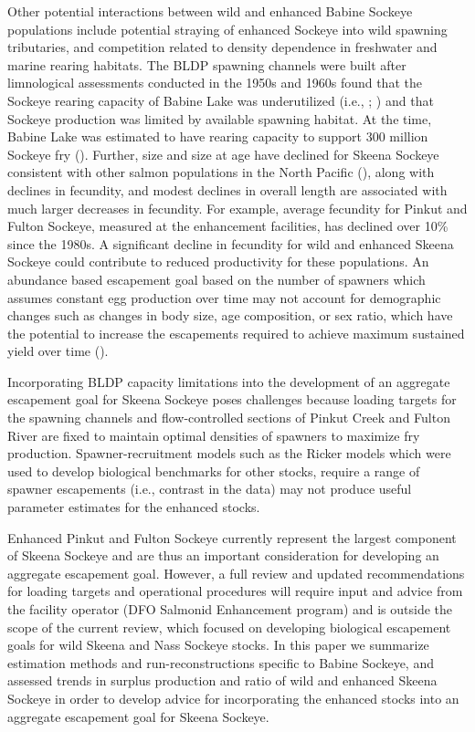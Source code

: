 \documentclass[french,11pt]{book}
\begin{document}
Other potential interactions between wild and enhanced Babine Sockeye populations include potential straying of enhanced Sockeye into wild spawning tributaries, and competition related to density dependence in freshwater and marine rearing habitats. The BLDP spawning channels were built after limnological assessments conducted in the 1950s and 1960s found that the Sockeye rearing capacity of Babine Lake was underutilized (i.e., ; ) and that Sockeye production was limited by available spawning habitat. At the time, Babine Lake was estimated to have rearing capacity to support 300 million Sockeye fry (). Further, size and size at age have declined for Skeena Sockeye consistent with other salmon populations in the North Pacific (), along with declines in fecundity, and modest declines in overall length are associated with much larger decreases in fecundity. For example, average fecundity for Pinkut and Fulton Sockeye, measured at the enhancement facilities, has declined over 10\% since the 1980s. A significant decline in fecundity for wild and enhanced Skeena Sockeye could contribute to reduced productivity for these populations. An abundance based escapement goal based on the number of spawners which assumes constant egg production over time may not account for demographic changes such as changes in body size, age composition, or sex ratio, which have the potential to increase the escapements required to achieve maximum sustained yield over time ().

Incorporating BLDP capacity limitations into the development of an aggregate escapement goal for Skeena Sockeye poses challenges because loading targets for the spawning channels and flow-controlled sections of Pinkut Creek and Fulton River are fixed to maintain optimal densities of spawners to maximize fry production. Spawner-recruitment models such as the Ricker models which were used to develop biological benchmarks for other stocks, require a range of spawner escapements (i.e., contrast in the data) may not produce useful parameter estimates for the enhanced stocks.

Enhanced Pinkut and Fulton Sockeye currently represent the largest component of Skeena Sockeye and are thus an important consideration for developing an aggregate escapement goal. However, a full review and updated recommendations for loading targets and operational procedures will require input and advice from the facility operator (DFO Salmonid Enhancement program) and is outside the scope of the current review, which focused on developing biological escapement goals for wild Skeena and Nass Sockeye stocks. In this paper we summarize estimation methods and run-reconstructions specific to Babine Sockeye, and assessed trends in surplus production and ratio of wild and enhanced Skeena Sockeye in order to develop advice for incorporating the enhanced stocks into an aggregate escapement goal for Skeena Sockeye.
\end{document}
